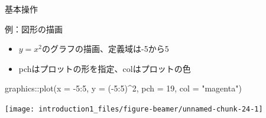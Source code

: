 \documentclass[
  ignorenonframetext,
]{beamer}
\newenvironment{Shaded}{\begin{snugshade}}{\end{snugshade}}
\newcommand{\AttributeTok}[1]{\textcolor[rgb]{0.77,0.63,0.00}{#1}}
\newcommand{\DecValTok}[1]{\textcolor[rgb]{0.00,0.00,0.81}{#1}}
\newcommand{\FunctionTok}[1]{\textcolor[rgb]{0.00,0.00,0.00}{#1}}
\newcommand{\NormalTok}[1]{#1}
\newcommand{\SpecialCharTok}[1]{\textcolor[rgb]{0.00,0.00,0.00}{#1}}
\newcommand{\StringTok}[1]{\textcolor[rgb]{0.31,0.60,0.02}{#1}}
\providecommand{\tightlist}{%
  \setlength{\itemsep}{0pt}\setlength{\parskip}{0pt}}
\begin{document}
\begin{frame}[fragile]{基本操作}
\begin{block}{例：図形の描画}
\protect\hypertarget{ux4f8bux56f3ux5f62ux306eux63cfux753b}{}
\begin{itemize}
\tightlist
\item
  \(y = x^2\)のグラフの描画、定義域は-5から5
\item
  pchはプロットの形を指定、colはプロットの色
\end{itemize}

\begin{Shaded}
\begin{Highlighting}[]
\NormalTok{graphics}\SpecialCharTok{::}\FunctionTok{plot}\NormalTok{(}\AttributeTok{x =} \SpecialCharTok{{-}}\DecValTok{5}\SpecialCharTok{:}\DecValTok{5}\NormalTok{, }\AttributeTok{y =}\NormalTok{ (}\SpecialCharTok{{-}}\DecValTok{5}\SpecialCharTok{:}\DecValTok{5}\NormalTok{)}\SpecialCharTok{\^{}}\DecValTok{2}\NormalTok{, }\AttributeTok{pch =} \DecValTok{19}\NormalTok{, }\AttributeTok{col =} \StringTok{"magenta"}\NormalTok{) }
\end{Highlighting}
\end{Shaded}

\begin{center}\texttt{[image: introduction1\_files/figure-beamer/unnamed-chunk-24-1]} \end{center}
\end{block}
\end{frame}
\end{document}
